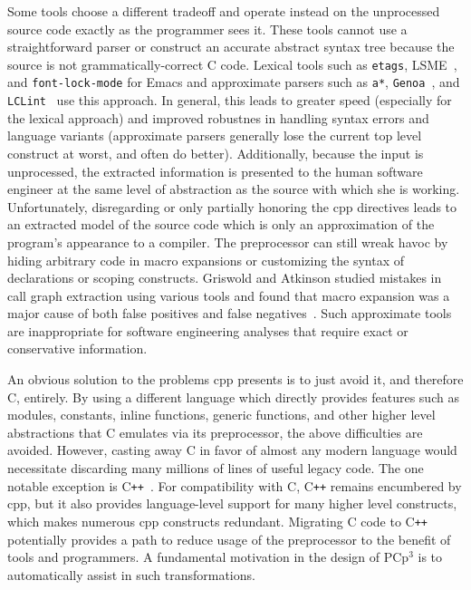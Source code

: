 \documentclass{article}
\newcommand{\pcp}{\mbox{\textsf{PCp}$^3$}}
\newcommand{\Cpp}{\mbox{\textsf{cpp}}}
\newcommand{\CPP}{\mbox{C\texttt{++}}}
\newcommand{\C}{\mbox{C}}
\begin{document}
Some tools choose a different tradeoff and operate instead on the
unprocessed source code exactly as the programmer sees it.  These tools
cannot use a straightforward parser or construct an accurate abstract
syntax tree because the source is not grammatically-correct \C{} code.
Lexical tools such as \texttt{etags}, LSME~\cite{Murphy96}, and
\texttt{font-lock-mode} for Emacs and approximate parsers such as
\texttt{a*},
\texttt{Genoa}~\cite{Devanbu92}, and \texttt{LCLint}~\cite{LCLint}
use this approach.  In general, this leads to greater speed (especially
for the lexical approach) and improved robustnes in handling syntax errors and
language variants (approximate parsers generally lose the current top
level construct at worst, and often do better). Additionally, because
the input is unprocessed, the extracted information is presented to the
human software engineer at the same level of abstraction as the source
with which she is working.  Unfortunately, disregarding or only
partially honoring the \Cpp{} directives leads to an extracted model of
the source code which is only an approximation of the program's
appearance to a compiler.  The preprocessor can still wreak havoc by
hiding arbitrary code in macro expansions or customizing the syntax of
declarations or scoping constructs.  Griswold and Atkinson studied
mistakes in call graph extraction using various tools and found that
macro expansion was a major cause of both false positives and false
negatives~\cite{Griswold96}.  Such approximate tools are inappropriate
for software engineering analyses that require exact or conservative
information.

An obvious solution to the problems \Cpp{} presents is to just avoid it,
and therefore \C{}, entirely.  By using a different language which
directly provides features such as modules, constants, inline functions,
generic functions, and other higher level abstractions that \C{}
emulates via its preprocessor, the above difficulties are avoided.
However, casting away \C{} in favor of almost any modern language would necessitate
discarding many millions of lines of useful legacy code.  The one notable
exception is \CPP{}~\cite{CD2DraftStandard}. For compatibility with
\C{}, \CPP{} remains encumbered by \Cpp{}, but it also provides
language-level support for many higher level constructs, which makes
numerous \Cpp{} constructs redundant.
Migrating \C{} code to \CPP{} potentially provides a path to reduce
usage of the preprocessor to the benefit of tools and programmers.  A
fundamental motivation in the design of \pcp{} is to automatically assist
in such transformations.
\end{document}
